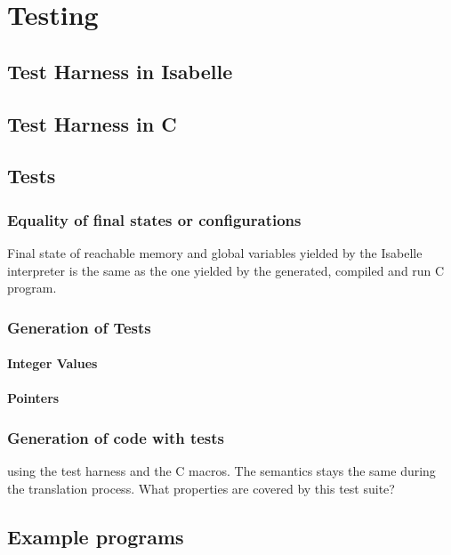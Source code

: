 \chapter{Testing}\label{chapter:testing}

\section{Test Harness in Isabelle}

\section{Test Harness in C}

\section{Tests}

\subsection{Equality of final states or configurations}

Final state of reachable memory and global variables yielded by the Isabelle interpreter is the same as the one yielded by the generated, compiled and run C program.

\subsection{Generation of Tests}

\subsubsection{Integer Values}
\subsubsection{Pointers}

\subsection{Generation of code with tests}
using the test harness and the C macros.
The semantics stays the same during the translation process.
What properties are covered by this test suite?

\section{Example programs}
